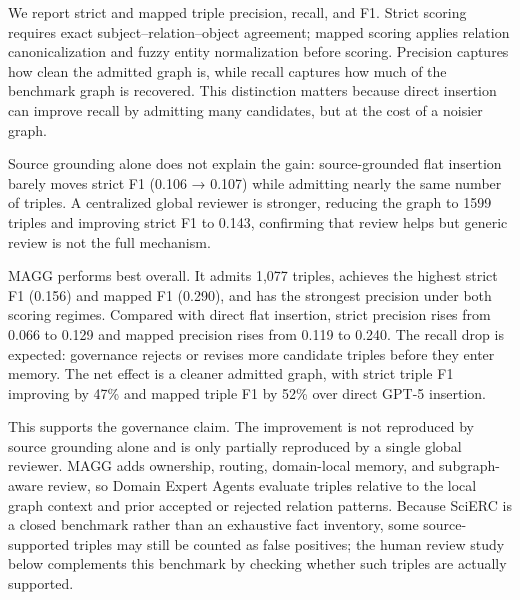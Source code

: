 \documentclass{article}
\newcommand{\system}{\textsc{MAGG}}
\begin{document}
We report strict and mapped triple precision, recall, and F1. Strict scoring requires exact subject--relation--object agreement; mapped scoring applies relation canonicalization and fuzzy entity normalization before scoring. Precision captures how clean the admitted graph is, while recall captures how much of the benchmark graph is recovered. This distinction matters because direct insertion can improve recall by admitting many candidates, but at the cost of a noisier graph.

Source grounding alone does not explain the gain: source-grounded flat insertion barely moves strict F1 (0.106 → 0.107) while admitting nearly the same number of triples. A centralized global reviewer is stronger, reducing the graph to 1599 triples and improving strict F1 to 0.143, confirming that review helps but generic review is not the full mechanism.

\system{} performs best overall. It admits 1,077 triples, achieves the highest strict F1 (0.156) and mapped F1 (0.290), and has the strongest precision under both scoring regimes. Compared with direct flat insertion, strict precision rises from 0.066 to 0.129 and mapped precision rises from 0.119 to 0.240. The recall drop is expected: governance rejects or revises more candidate triples before they enter memory. The net effect is a cleaner admitted graph, with strict triple F1 improving by 47\% and mapped triple F1 by 52\% over direct GPT-5 insertion.

This supports the governance claim. The improvement is not reproduced by source grounding alone and is only partially reproduced by a single global reviewer. \system{} adds ownership, routing, domain-local memory, and subgraph-aware review, so Domain Expert Agents evaluate triples relative to the local graph context and prior accepted or rejected relation patterns. Because SciERC is a closed benchmark rather than an exhaustive fact inventory, some source-supported triples may still be counted as false positives; the human review study below complements this benchmark by checking whether such triples are actually supported.  
\end{document}
